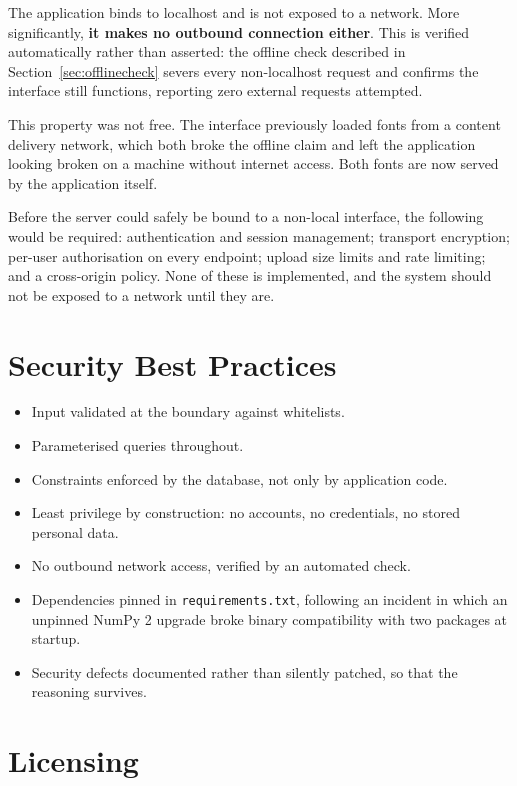 \documentclass[
12pt,
a4paper,
oneside
]{report}
\begin{document}
The application binds to localhost and is not exposed to a network. More
significantly, \textbf{it makes no outbound connection either}. This is verified
automatically rather than asserted: the offline check described in
Section~\ref{sec:offlinecheck} severs every non-localhost request and confirms
the interface still functions, reporting zero external requests attempted.

This property was not free. The interface previously loaded fonts from a content
delivery network, which both broke the offline claim and left the application
looking broken on a machine without internet access. Both fonts are now served
by the application itself.

Before the server could safely be bound to a non-local interface, the following
would be required: authentication and session management; transport encryption;
per-user authorisation on every endpoint; upload size limits and rate limiting;
and a cross-origin policy. None of these is implemented, and the system should
not be exposed to a network until they are.

\section{Security Best Practices}

\begin{itemize}[itemsep=3pt]
\item Input validated at the boundary against whitelists.
\item Parameterised queries throughout.
\item Constraints enforced by the database, not only by application code.
\item Least privilege by construction: no accounts, no credentials, no stored
personal data.
\item No outbound network access, verified by an automated check.
\item Dependencies pinned in \texttt{requirements.txt}, following an incident in
which an unpinned NumPy 2 upgrade broke binary compatibility with two packages
at startup.
\item Security defects documented rather than silently patched, so that the
reasoning survives.
\end{itemize}

\section{Licensing}
\label{sec:licensing}
\end{document}
